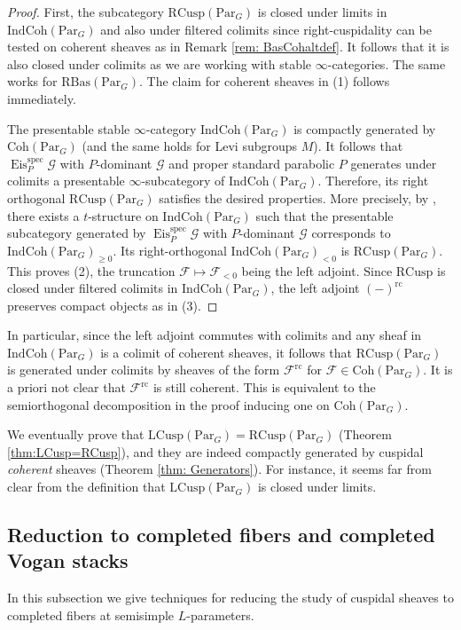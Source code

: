\documentclass{amsart}
\theoremstyle{definition}
\theoremstyle{remark}
\numberwithin{equation}{section}
\newcommand{\mc}{\mathcal}
\newcommand{\spec}{\mathrm{spec}}
\newcommand{\Par}{\mathrm{Par}}
\newcommand{\IndCoh}{\mathrm{IndCoh}}
\DeclareMathOperator{\Eis}{\mathrm{Eis}}
\newcommand{\Coh}{\mathrm{Coh}}
\newcommand{\LCusp}{\mathrm{LCusp}}
\newcommand{\RCusp}{\mathrm{RCusp}}
\newcommand{\rc}{\mathrm{rc}}
\newcommand{\RBas}{\mathrm{RBas}}
\begin{document}
\begin{proof}
First, the subcategory $\RCusp(\Par_G)$ is closed under limits in $\IndCoh(\Par_G)$ and also under filtered colimits since right-cuspidality can be tested on coherent sheaves as in Remark \ref{rem: BasCohaltdef}. It follows that it is also closed under colimits as we are working with stable $\infty$-categories. The same works for $\RBas(\Par_G)$. The claim for coherent sheaves in (1) follows immediately. 

The presentable stable $\infty$-category $\IndCoh(\Par_G)$ is compactly generated by $\Coh(\Par_G)$ (and the same holds for Levi subgroups $M$). It follows that $\Eis_{P}^{\spec} \mc{G}$ with $P$-dominant $\mc{G}$ and proper standard parabolic $P$ generates under colimits a presentable $\infty$-subcategory of $\IndCoh(\Par_G)$. Therefore, its right orthogonal $\RCusp(\Par_G)$ satisfies the desired properties. More precisely, by \cite[Proposition 1.4.4.11]{LurieHA}, there exists a $t$-structure on $\IndCoh(\Par_G)$ such that the presentable subcategory generated by $\Eis_{P}^{\spec} \mc{G}$ with $P$-dominant $\mc{G}$ corresponds to $\IndCoh(\Par_G)_{\geq 0}$.  Its right-orthogonal $\IndCoh(\Par_G)_{<0}$ is $\RCusp(\Par_G)$. This proves (2), the truncation $\mc F\mapsto \mc F_{<0}$ being the left adjoint. Since $\RCusp$ is closed under filtered colimits in $\IndCoh(\Par_G)$, the left adjoint $(-)^\rc$ preserves compact objects as in (3). 
\end{proof}

In particular, since the left adjoint commutes with colimits and any sheaf in $\IndCoh(\Par_G)$ is a colimit of coherent sheaves, it follows that $\RCusp(\Par_G)$ is generated under colimits by sheaves of the form $\mc{F}^{\rc}$ for $\mc{F} \in \Coh(\Par_G)$. It is a priori not clear that $\mc F^\rc$ is still coherent. This is equivalent to the semiorthogonal decomposition in the proof inducing one on $\Coh(\Par_G)$. 

We eventually prove that $\LCusp(\Par_G) = \RCusp(\Par_G)$ (Theorem \ref{thm:LCusp=RCusp}), and they are indeed compactly generated by cuspidal \emph{coherent} sheaves (Theorem \ref{thm: Generators}). For instance, it seems far from clear from the definition that $\LCusp(\Par_G)$ is closed under limits. 


\subsection{Reduction to completed fibers and completed Vogan stacks}{\label{ss: reductiontocompletedfiber}}
In this subsection we give techniques for reducing the study of cuspidal sheaves to completed fibers at semisimple $L$-parameters.
\end{document}

